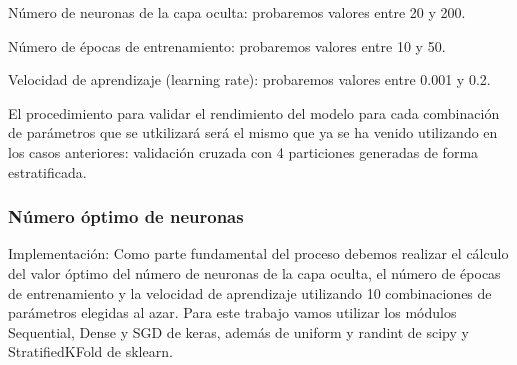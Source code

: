 \documentclass[11pt]{article}
\begin{document}
Número de neuronas de la capa oculta: probaremos valores entre 20 y 200.

Número de épocas de entrenamiento: probaremos valores entre 10 y 50.

Velocidad de aprendizaje (learning rate): probaremos valores entre 0.001
y 0.2.

El procedimiento para validar el rendimiento del modelo para cada
combinación de parámetros que se utkilizará será el mismo que ya se ha
venido utilizando en los casos anteriores: validación cruzada con 4
particiones generadas de forma estratificada.

    \hypertarget{nuxfamero-uxf3ptimo-de-neuronas}{%
\subsubsection{Número óptimo de
neuronas}\label{nuxfamero-uxf3ptimo-de-neuronas}}

Implementación: Como parte fundamental del proceso debemos realizar el
cálculo del valor óptimo del número de neuronas de la capa oculta, el
número de épocas de entrenamiento y la velocidad de aprendizaje
utilizando 10 combinaciones de parámetros elegidas al azar. Para este
trabajo vamos utilizar los módulos Sequential, Dense y SGD de keras,
además de uniform y randint de scipy y StratifiedKFold de sklearn.
\end{document}
